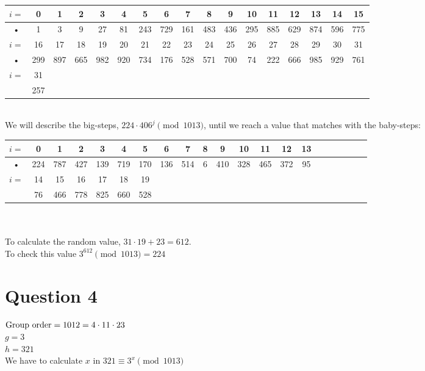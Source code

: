 \documentclass{article}
\begin{document}
\begin{tabular}{|c|c|c|c|c|c|c|c|c|c|c|c|c|c|c|c|c|}
\hline 
$i = $ & 0 & 1 & 2 & 3 & 4 & 5 & 6 & 7 & 8 & 9 & 10 & 11 & 12 & 13 & 14 & 15 \\ 
\hline 
• & 1 & 3 & 9 & 27 & 81 & 243 & 729 & 161 & 483 & 436 & 295 & 885 & 629 & 874 & 596 & 775 \\ 
\hline 
$i = $ & 16 & 17 & 18 & 19 & 20 & 21 & 22 & 23 & 24 & 25 & 26 & 27 & 28 & 29 & 30 & 31 \\ 
\hline 
• & 299 & 897 & 665 & 982 & 920 & 734 & 176 & 528 & 571 & 700 & 74 & 222 & 666 & 985 & 929 & 761 \\ 
\hline
$i = $ & 31 & & & & & & & & & & & & & & & \\
\hline
 	   & 257& & & & & & & & & & & & & & & \\
 \hline
\end{tabular}\\

We will describe the big-steps, $224 \cdot 406^j \pmod{1013}$, until we reach a value that matches with the baby-steps:\\

\begin{tabular}{|c|c|c|c|c|c|c|c|c|c|c|c|c|c|c|c|c|c|c|c|c|}
\hline 
$i = $ & 0 & 1 & 2 & 3 & 4 & 5 & 6 & 7 & 8 & 9 & 10 & 11 & 12 & 13 \\ 
\hline 
• & 224 & 787 & 427 & 139 & 719 & 170 & 136 & 514 & 6 & 410 & 328 & 465 & 372 & 95 \\ 
\hline 
$i = $ & 14 & 15 & 16 & 17 & 18 & 19 & & & & & & & & \\
\hline
 & 76 & 466 & 778 & 825 & 660 & 528 & & & & & & & & \\
\hline
\end{tabular}\\
\\
To calculate the random value, $31 \cdot 19 + 23 = 612$. \\
To check this value $3^{612} \pmod{1013} = 224$

\section{Question 4}

$\hbox{Group order} = 1012 = 4 \cdot 11 \cdot 23$\\
$g = 3$\\
$h = 321$\\
We have to calculate $x$ in $321 \equiv 3^x \pmod{1013}$\\
\end{document}
